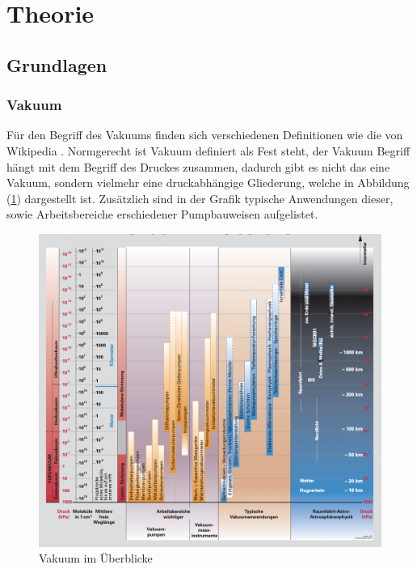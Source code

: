 \section{Theorie}
\label{sec:Theorie}

\subsection{Grundlagen}
\subsubsection{Vakuum}
Für den Begriff des Vakuums finden sich verschiedenen Definitionen
wie die von Wikipedia \cite[Vakuum ist in der technischen Praxis ein Raum mit weitgehender Abwesenheit von Materie.]{dewiki}.
Normgerecht ist Vakuum definiert als 
\cite[der Zustand eines Gases, 
wenn in einem Behälter der Druck des Gases 
und damit die Teilchenzahldichte niedriger ist als außerhalb oder wenn der Druck des Gases niedriger ist als 300 mbar,
d. h. kleiner als der niedrigste auf der Erdoberfläche vorkommende Atmosphärendruck.]{DIN} 
Fest steht, der Vakuum Begriff hängt mit dem Begriff des Druckes zusammen,
dadurch gibt es nicht das eine Vakuum, sondern vielmehr eine druckabhängige Gliederung,
welche in Abbildung (\ref{fig:Vakuum}) dargestellt ist. 
Zusätzlich sind in der Grafik typische Anwendungen dieser,
sowie Arbeitsbereiche erschiedener Pumpbauweisen aufgelistet.
\begin{figure}[ht]
    \centering
    \includegraphics[width=\textwidth]{abb/Vakuum.png}
    \caption{Vakuum im Überblicke \cite{Pfeifer}}
    \label{fig:Vakuum}
\end{figure}

